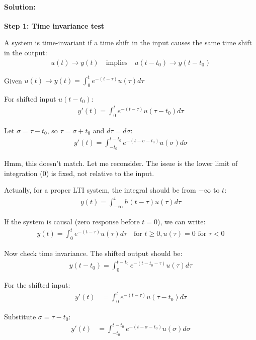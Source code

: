 \documentclass[11pt,a4paper]{article}
\begin{document}
\paragraph{Solution:}

\textbf{Step 1: Time invariance test}

A system is time-invariant if a time shift in the input causes the same time shift in the output:
\begin{align}
  u(t) \to y(t) \quad \text{implies} \quad u(t - t_0) \to y(t - t_0)
\end{align}

Given $u(t) \to y(t) = \int_0^t e^{-(t-\tau)} u(\tau) d\tau$

For shifted input $u(t - t_0)$:
\begin{align}
  y'(t) = \int_0^t e^{-(t-\tau)} u(\tau - t_0) d\tau
\end{align}

Let $\sigma = \tau - t_0$, so $\tau = \sigma + t_0$ and $d\tau = d\sigma$:
\begin{align}
  y'(t) = \int_{-t_0}^{t-t_0} e^{-(t-\sigma-t_0)} u(\sigma) d\sigma
\end{align}

Hmm, this doesn't match. Let me reconsider. The issue is the lower limit of integration (0) is fixed, not relative to the input.

Actually, for a proper LTI system, the integral should be from $-\infty$ to $t$:
\begin{align}
  y(t) = \int_{-\infty}^t h(t-\tau) u(\tau) d\tau
\end{align}

If the system is causal (zero response before $t=0$), we can write:
\begin{align}
  y(t) = \int_0^t e^{-(t-\tau)} u(\tau) d\tau \quad \text{for } t \geq 0, u(\tau) = 0 \text{ for } \tau < 0
\end{align}

Now check time invariance. The shifted output should be:
\begin{align}
  y(t - t_0) = \int_0^{t-t_0} e^{-(t-t_0-\tau)} u(\tau) d\tau
\end{align}

For the shifted input:
\begin{align}
  y'(t) &= \int_0^t e^{-(t-\tau)} u(\tau - t_0) d\tau
\end{align}

Substitute $\sigma = \tau - t_0$:
\begin{align}
  y'(t) &= \int_{-t_0}^{t-t_0} e^{-(t-\sigma-t_0)} u(\sigma) d\sigma
\end{align}
\end{document}
